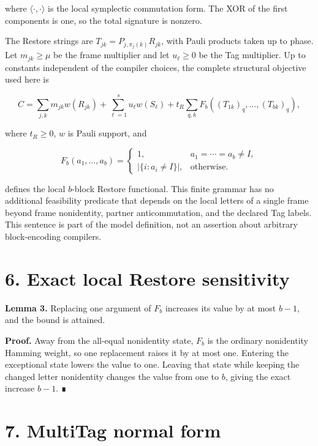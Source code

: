 \documentclass[
  11pt,
]{article}
\begin{document}
where \(\langle\cdot, \cdot\rangle\) is the local symplectic commutation
form. The XOR of the first components is one, so the total signature is
nonzero.

The Restore strings are \(T_{jk}=P_{j,\pi_j(k)}R_{jk}\), with Pauli
products taken up to phase. Let \(m_{jk}\ge\mu\) be the frame multiplier
and let \(u_\ell\ge0\) be the Tag multiplier. Up to constants
independent of the compiler choices, the complete structural objective
used here is

\[
C=\sum_{j,k}m_{jk}w(R_{jk})
 +\sum_{\ell=1}^s u_\ell w(S_\ell)
 +t_R\sum_{q,k}F_b((T_{1k})_q,\ldots,(T_{bk})_q),
\]

where \(t_R\ge0\), \(w\) is Pauli support, and

\[
F_b(a_1, \ldots, a_b)=
\begin{cases}
1, & a_1=\cdots=a_b\ne I, \\
|\{i:a_i\ne I\}|, & \text{otherwise}.
\end{cases}
\]

defines the local \(b\)-block Restore functional. This finite grammar
has no additional feasibility predicate that depends on the local
letters of a single frame beyond frame nonidentity, partner
anticommutation, and the declared Tag labels. This sentence is part of
the model definition, not an assertion about arbitrary block-encoding
compilers.

\hypertarget{exact-local-restore-sensitivity}{%
\section{6. Exact local Restore
sensitivity}\label{exact-local-restore-sensitivity}}

\textbf{Lemma 3.} Replacing one argument of \(F_b\) increases its value
by at most \(b-1\), and the bound is attained.

\textbf{Proof.} Away from the all-equal nonidentity state, \(F_b\) is
the ordinary nonidentity Hamming weight, so one replacement raises it by
at most one. Entering the exceptional state lowers the value to one.
Leaving that state while keeping the changed letter nonidentity changes
the value from one to \(b\), giving the exact increase \(b-1\). ∎

\hypertarget{multitag-normal-form}{%
\section{7. MultiTag normal form}\label{multitag-normal-form}}
\end{document}
